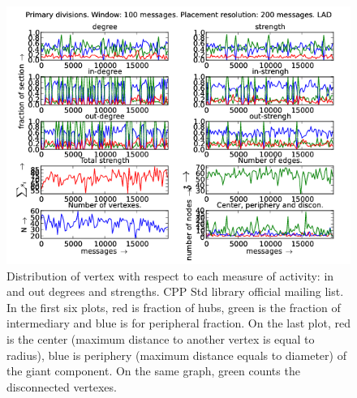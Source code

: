 \documentclass[%
 aip,
 jmp,%
 amsmath,amssymb,
 reprint,%
]{revtex4-1}
\begin{document}
\begin{figure}[hbtp] 
   \centering
        \includegraphics[width=\textwidth]{figs/LAD/100}
    \caption{Distribution of vertex with respect to each measure of activity: in and out degrees and strengths. CPP Std library official mailing list. In the first six plots, red is fraction of hubs, green is the fraction of intermediary and blue is for peripheral fraction. On the last plot, red is the center (maximum distance to another vertex is equal to radius), blue is periphery (maximum distance equals to diameter) of the giant component. On the same graph, green counts the disconnected vertexes.}
    \label{fig:lad100}
\end{figure}
\end{document}
